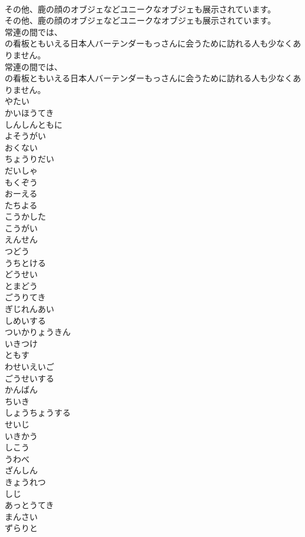 \documentclass[8pt]{extreport}
\begin{document}
\begin{CJK}{UTF8}{min}
\\	その他、鹿の顔のオブジェなどユニークなオブジェも展示されています。
\\	その他、鹿の顔のオブジェなどユニークなオブジェも展示されています。
\\	常連の間では、
\\	の看板ともいえる日本人バーテンダーもっさんに会うために訪れる人も少なくありません。
\\	常連の間では、
\\	の看板ともいえる日本人バーテンダーもっさんに会うために訪れる人も少なくありません。
\\	やたい
\\	かいほうてき
\\	しんしんともに
\\	よそうがい
\\	おくない
\\	ちょうりだい
\\	だいしゃ
\\	もくぞう
\\	おーえる
\\	たちよる
\\	こうかした
\\	こうがい
\\	えんせん
\\	つどう
\\	うちとける
\\	どうせい
\\	とまどう
\\	ごうりてき
\\	ぎじれんあい
\\	しめいする
\\	ついかりょうきん
\\	いきつけ
\\	ともす
\\	わせいえいご
\\	ごうせいする
\\	かんばん
\\	ちいき
\\	しょうちょうする
\\	せいじ
\\	いきかう
\\	しこう
\\	うわべ
\\	ざんしん
\\	きょうれつ
\\	しじ
\\	あっとうてき
\\	まんさい
\\	ずらりと

\end{CJK}
\end{document}
